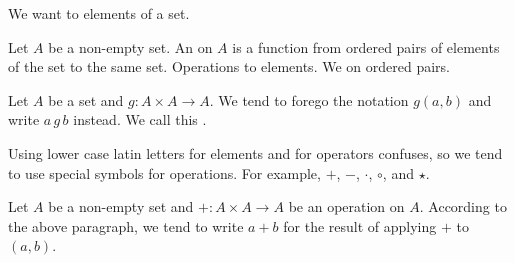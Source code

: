 
\sbasic






\sstart
{}


We want to 
elements of a set.


Let $A$ be a non-empty set.
An  on $A$ is
a function from ordered pairs of elements
of the set to the same set.
Operations to  elements.
We  on ordered pairs.


Let $A$ be a set and
$g: A \times A \to A$.
We tend to forego the notation
$g(a, b)$ and
write $a\,g\,b$ instead.
We call this
.

Using lower case latin
letters for elements and for operators
confuses, so we tend to use
special symbols for operations.
For example,
$+$, $-$, $\cdot$, $\circ$, and $\star$.

Let $A$ be a non-empty set
and $+: A \times A \to A$ be
an operation on $A$.
According to the above paragraph,
we tend to write
$a+b$ for the result of applying $+$
to $(a,b)$.
\strats
